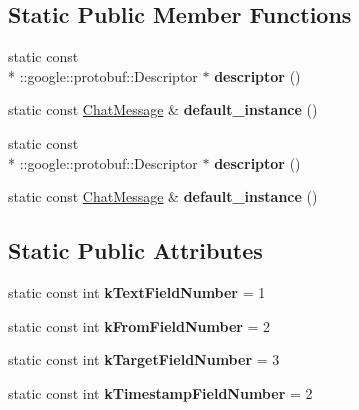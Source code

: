 \subsection*{Static Public Member Functions}
\begin{DoxyCompactItemize}
\item 
\hypertarget{classSimpleChat_1_1ChatMessage_aaa3e96d79676a6db090ef3673c3d83bc}{static const \\*
\-::google\-::protobuf\-::\-Descriptor $\ast$ {\bfseries descriptor} ()}\label{classSimpleChat_1_1ChatMessage_aaa3e96d79676a6db090ef3673c3d83bc}

\item 
\hypertarget{classSimpleChat_1_1ChatMessage_a4d48b780815d1f79fc0d842328d517a9}{static const \hyperlink{classSimpleChat_1_1ChatMessage}{Chat\-Message} \& {\bfseries default\-\_\-instance} ()}\label{classSimpleChat_1_1ChatMessage_a4d48b780815d1f79fc0d842328d517a9}

\item 
\hypertarget{classSimpleChat_1_1ChatMessage_aaa3e96d79676a6db090ef3673c3d83bc}{static const \\*
\-::google\-::protobuf\-::\-Descriptor $\ast$ {\bfseries descriptor} ()}\label{classSimpleChat_1_1ChatMessage_aaa3e96d79676a6db090ef3673c3d83bc}

\item 
\hypertarget{classSimpleChat_1_1ChatMessage_a4d48b780815d1f79fc0d842328d517a9}{static const \hyperlink{classSimpleChat_1_1ChatMessage}{Chat\-Message} \& {\bfseries default\-\_\-instance} ()}\label{classSimpleChat_1_1ChatMessage_a4d48b780815d1f79fc0d842328d517a9}

\end{DoxyCompactItemize}
\subsection*{Static Public Attributes}
\begin{DoxyCompactItemize}
\item 
\hypertarget{classSimpleChat_1_1ChatMessage_a8f3988baed7f92a2d06dc68470bd9e83}{static const int {\bfseries k\-Text\-Field\-Number} = 1}\label{classSimpleChat_1_1ChatMessage_a8f3988baed7f92a2d06dc68470bd9e83}

\item 
\hypertarget{classSimpleChat_1_1ChatMessage_a0fbedada5a581810caed105b45f54a06}{static const int {\bfseries k\-From\-Field\-Number} = 2}\label{classSimpleChat_1_1ChatMessage_a0fbedada5a581810caed105b45f54a06}

\item 
\hypertarget{classSimpleChat_1_1ChatMessage_add4726728179ad57b2eeac2b0fc9a516}{static const int {\bfseries k\-Target\-Field\-Number} = 3}\label{classSimpleChat_1_1ChatMessage_add4726728179ad57b2eeac2b0fc9a516}

\item 
\hypertarget{classSimpleChat_1_1ChatMessage_a3762bdd14c1f6ce170c837f5a2d4e5d9}{static const int {\bfseries k\-Timestamp\-Field\-Number} = 2}\label{classSimpleChat_1_1ChatMessage_a3762bdd14c1f6ce170c837f5a2d4e5d9}

\end{DoxyCompactItemize}
